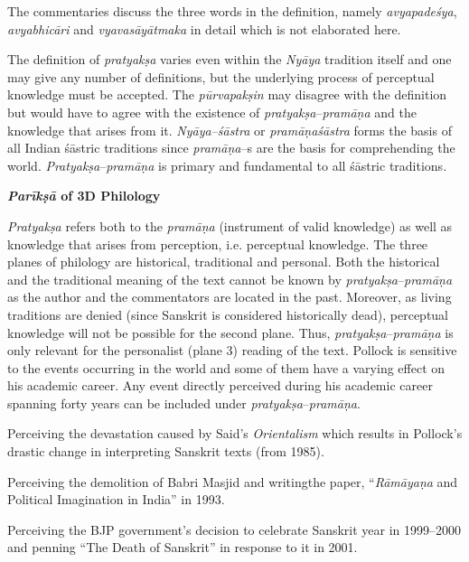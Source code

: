 The commentaries discuss the three words in the definition, namely \textit{avyapadeśya}, \textit{avyabhicāri} and \textit{vyavasāyātmaka} in detail which is not elaborated here.

The definition of \textit{pratyakṣa} varies even within the \textit{Nyāya} tradition itself and one may give any number of definitions, but the underlying process of perceptual knowledge must be accepted. The \textit{pūrvapakṣin} may disagree with the definition but would have to agree with the existence of \textit{pratyakṣa}–\textit{pramāṇa} and the knowledge that arises from it. \textit{Nyāya–śāstra} or \textit{pramāṇaśāstra} forms the basis of all Indian śāstric traditions since\textit{ pramāṇa}–s are the basis for comprehending the world. \textit{Pratyakṣa}–\textit{pramāṇa }is primary and fundamental to all śāstric traditions.

\textbf{\textit{Parīkṣā} of 3D Philology}

\textit{Pratyakṣa} refers both to the \textit{pramāṇa} (instrument of valid knowledge) as well as knowledge that arises from perception, i.e. perceptual knowledge. The three planes of philology are historical, traditional and personal. Both the historical and the traditional meaning of the text cannot be known by \textit{pratyakṣa}–\textit{pramāṇa} as the author and the commentators are located in the past. Moreover, as living traditions are denied (since Sanskrit is considered historically dead), perceptual knowledge will not be possible for the second plane. Thus, \textit{pratyakṣa}–\textit{pramāṇa }is only relevant for the personalist (plane 3) reading of the text. Pollock is sensitive to the events occurring in the world and some of them have a varying effect on his academic career. Any event directly perceived during his academic career spanning forty years can be included under \textit{pratyakṣa}–\textit{pramāṇa}.

\item Perceiving the devastation caused by Said’s \textit{Orientalism} which results in Pollock’s drastic change in interpreting Sanskrit texts (from 1985).

 \item Perceiving the demolition of Babri Masjid and writingthe paper, “\textit{Rāmāyaṇa }and Political Imagination in India” in 1993.

 \item Perceiving the BJP government’s decision to celebrate Sanskrit year in 1999–2000 and penning “The Death of Sanskrit” in response to it in 2001.

